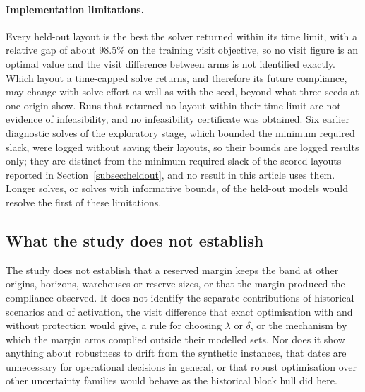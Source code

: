 \paragraph{Implementation limitations.} Every held-out layout is the best the solver returned within its time limit, with a relative gap of about 98.5\% on the training visit objective, so no visit figure is an optimal value and the visit difference between arms is not identified exactly. Which layout a time-capped solve returns, and therefore its future compliance, may change with solve effort as well as with the seed, beyond what three seeds at one origin show. Runs that returned no layout within their time limit are not evidence of infeasibility, and no infeasibility certificate was obtained. Six earlier diagnostic solves of the exploratory stage, which bounded the minimum required slack, were logged without saving their layouts, so their bounds are logged results only; they are distinct from the minimum required slack of the scored layouts reported in Section~\ref{subsec:heldout}, and no result in this article uses them. Longer solves, or solves with informative bounds, of the held-out models would resolve the first of these limitations.

\subsection{What the study does not establish}\label{subsec:rulesout}
The study does not establish that a reserved margin keeps the band at other origins, horizons, warehouses or reserve sizes, or that the margin produced the compliance observed. It does not identify the separate contributions of historical scenarios and of activation, the visit difference that exact optimisation with and without protection would give, a rule for choosing $\lambda$ or $\delta$, or the mechanism by which the margin arms complied outside their modelled sets. Nor does it show anything about robustness to drift from the synthetic instances, that dates are unnecessary for operational decisions in general, or that robust optimisation over other uncertainty families would behave as the historical block hull did here.
